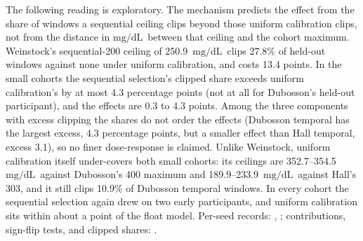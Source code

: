 \documentclass[10pt,twocolumn]{article}
\newcommand{\mgdl}{\ensuremath{\mathrm{mg/dL}}}
\begin{document}
{\ifdefined\XeTeXversion\else{}\fi
The following reading is exploratory. The mechanism predicts the effect
from the share of windows a sequential ceiling clips beyond those uniform
calibration clips, not from the distance in \mgdl\ between that ceiling
and the cohort maximum. Weinstock's sequential-200 ceiling of
250.9~\mgdl\ clips 27.8\% of held-out windows against none under uniform
calibration, and costs 13.4 points. In the small cohorts the sequential
selection's clipped share exceeds uniform calibration's by at most 4.3
percentage points (not at all for Dubosson's held-out participant), and
the effects are 0.3 to 4.3 points. Among the three components with excess
clipping the shares do not order the effects (Dubosson temporal has the
largest excess, 4.3 percentage points, but a smaller effect than Hall
temporal, excess 3.1), so no finer dose-response is claimed. Unlike
Weinstock, uniform calibration itself under-covers both small cohorts: its
ceilings are 352.7--354.5~\mgdl\ against Dubosson's 400 maximum and
189.9--233.9~\mgdl\ against Hall's 303, and it still clips 10.9\% of
Dubosson temporal windows. In every cohort the sequential selection again
drew on two early participants, and uniform calibration sits within about
a point of the float model. Per-seed records:
, ;
contributions, sign-flip tests, and clipped shares:
.\par}
\end{document}
